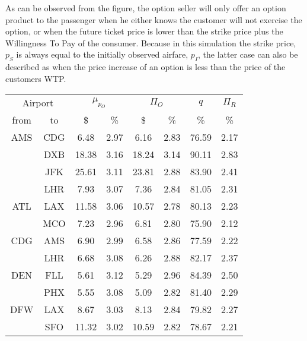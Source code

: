  
As can be observed from the figure, the option seller will only offer an option product to the passenger when he either knows the customer will not exercise the option, or when the future ticket price is lower than the strike price plus the Willingness To Pay of the consumer. Because in this simulation the strike price, $p_S$ is always equal to the initially observed airfare, $p_I$, the latter case can also be described as when the price increase of an option is less than the price of the customers WTP.




\begin{table}
\begin{center}
\begin{tabular}{c c | c c | c c | c | c }
\toprule
\multicolumn{2}{c|}{Airport}  &  \multicolumn{2}{c|}{$\mu_{p_O}$} & \multicolumn{2}{c|}{$\Pi_O$}  &  $q$  & $\Pi_R$ \\[.4ex]
from  &  to  &  \$  & \%  &  \$  & \%  & \%  & \% \\
    \midrule
AMS  &  CDG  &    6.48  &  2.97  &    6.16  &  2.83  &  76.59  &  2.17 \\
~    &  DXB  &   18.38  &  3.16  &   18.24  &  3.14  &  90.11  &  2.83 \\
~    &  JFK  &   25.61  &  3.11  &   23.81  &  2.88  &  83.90  &  2.41 \\
~    &  LHR  &    7.93  &  3.07  &    7.36  &  2.84  &  81.05  &  2.31 \\[.5ex]
ATL  &  LAX  &   11.58  &  3.06  &   10.57  &  2.78  &  80.13  &  2.23 \\
~    &  MCO  &    7.23  &  2.96  &    6.81  &  2.80  &  75.90  &  2.12 \\[.5ex]
CDG  &  AMS  &    6.90  &  2.99  &    6.58  &  2.86  &  77.59  &  2.22 \\
~    &  LHR  &    6.68  &  3.08  &    6.26  &  2.88  &  82.17  &  2.37 \\[.5ex]
DEN  &  FLL  &    5.61  &  3.12  &    5.29  &  2.96  &  84.39  &  2.50 \\
~    &  PHX  &    5.55  &  3.08  &    5.09  &  2.82  &  81.40  &  2.29 \\[.5ex]
DFW  &  LAX  &    8.67  &  3.03  &    8.13  &  2.84  &  79.82  &  2.27 \\
~    &  SFO  &   11.32  &  3.02  &   10.59  &  2.82  &  78.67  &  2.21 \\[.5ex]

\end{tabular}
\end{center}
\end{table}
